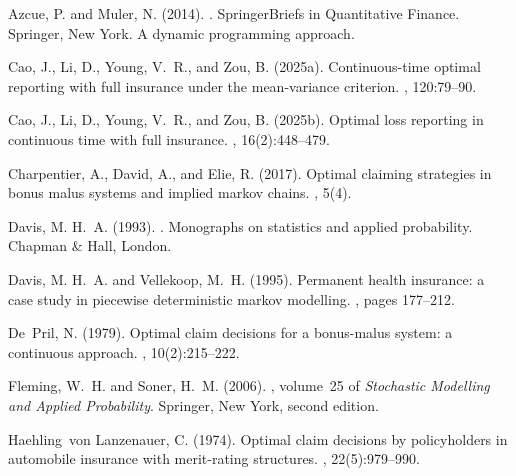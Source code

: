 \documentclass[a4paper]{scrartcl}
\theoremstyle{remark}
\theoremstyle{definition}
\numberwithin{equation}{section}
\begin{document}


\begin{thebibliography}{}

Azcue, P. and Muler, N. (2014).
.
\newblock SpringerBriefs in Quantitative Finance. Springer, New York.
\newblock A dynamic programming approach.

Cao, J., Li, D., Young, V.~R., and Zou, B. (2025a).
\newblock Continuous-time optimal reporting with full insurance under the mean-variance criterion.
, 120:79--90.

Cao, J., Li, D., Young, V.~R., and Zou, B. (2025b).
\newblock Optimal loss reporting in continuous time with full insurance.
, 16(2):448--479.

Charpentier, A., David, A., and Elie, R. (2017).
\newblock Optimal claiming strategies in bonus malus systems and implied markov chains.
, 5(4).

Davis, M. H.~A. (1993).
.
\newblock Monographs on statistics and applied probability. Chapman \& Hall, London.

Davis, M. H.~A. and Vellekoop, M.~H. (1995).
\newblock Permanent health insurance: a case study in piecewise deterministic markov modelling.
, pages 177--212.

De~Pril, N. (1979).
\newblock Optimal claim decisions for a bonus-malus system: a continuous approach.
, 10(2):215--222.

Fleming, W.~H. and Soner, H.~M. (2006).
, volume~25 of {\em Stochastic Modelling and Applied Probability}.
\newblock Springer, New York, second edition.

Haehling~von Lanzenauer, C. (1974).
\newblock Optimal claim decisions by policyholders in automobile insurance with merit-rating structures.
, 22(5):979--990.


\end{thebibliography}
\end{document}
